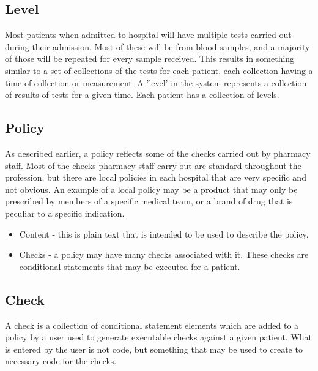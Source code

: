 \documentclass[letterpaper]{amsart}
\begin{document}
\subsection{Level}
Most patients when admitted to hospital will have multiple tests carried out during their admission.  Most of these will be from blood samples, and a majority of those will be repeated for every sample received.  This results in something similar to a set of collections of the tests for each patient, each collection having a time of collection or measurement.  A 'level' in the system represents a collection of results of tests for a given time.  Each patient has a collection of levels.
\subsection{Policy}
As described earlier, a policy reflects some of the checks carried out by pharmacy staff.  Most of the checks pharmacy staff carry out are standard throughout the profession, but there are local policies in each hospital that are very specific and not obvious.  An example of a local policy may be a product that may only be prescribed by members of a specific medical team, or a brand of drug that is peculiar to a specific indication.
\begin{itemize}
    \item Content - this is plain text that is intended to be used to describe the policy. 
    \item Checks - a policy may have many checks associated with it.  These checks are conditional statements that may be executed for a patient.
\end{itemize}
\subsection{Check}
A check is a collection of conditional statement elements which are added to a policy by a user used to generate executable checks against a given patient.  What is entered by the user is not code, but something that may be used to create to necessary code for the checks.
\end{document}
